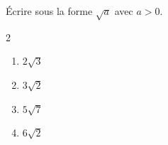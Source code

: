 \begin{exo}{}
	Écrire sous la forme $\sqrt{a}$ avec $a > 0$.
	\vspace*{-2mm}\begin{multicols}{2}
	\begin{enumerate}[itemsep=2mm]
		\item $2\sqrt{3}$
		\item $3\sqrt{2}$
		\item $5\sqrt{7}$
		\item $6\sqrt{2}$
	\end{enumerate}
	\end{multicols}
\end{exo}
